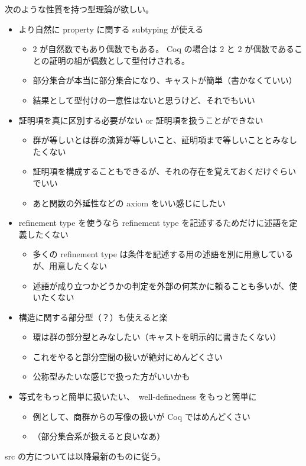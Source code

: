 次のような性質を持つ型理論が欲しい。

\begin{itemize}
  \item より自然に property に関する subtyping が使える
  \begin{itemize}
    \item \(2\) が自然数でもあり偶数でもある。
    Coq の場合は \(2\) と \(2\) が偶数であることの証明の組が偶数として型付けされる。
    \item 部分集合が本当に部分集合になり、キャストが簡単（書かなくていい）
    \item 結果として型付けの一意性はないと思うけど、それでもいい
  \end{itemize}

  \item 証明項を真に区別する必要がない or 証明項を扱うことができない
  \begin{itemize}
    \item 群が等しいとは群の演算が等しいこと、証明項まで等しいこととみなしたくない
    \item 証明項を構成することもできるが、それの存在を覚えておくだけぐらいでいい
    \item あと関数の外延性などの axiom をいい感じにしたい
  \end{itemize}

  \item refinement type を使うなら refinement type を記述するためだけに述語を定義したくない
  \begin{itemize}
    \item 多くの refinement type は条件を記述する用の述語を別に用意しているが、用意したくない
    \item 述語が成り立つかどうかの判定を外部の何某かに頼ることも多いが、使いたくない
  \end{itemize}

  \item 構造に関する部分型（？）も使えると楽
  \begin{itemize}
    \item 環は群の部分型とみなしたい（キャストを明示的に書きたくない）
    \item これをやると部分空間の扱いが絶対にめんどくさい
    \item 公称型みたいな感じで扱った方がいいかも
  \end{itemize}

  \item 等式をもっと簡単に扱いたい、　well-definedness をもっと簡単に
  \begin{itemize}
    \item 例として、商群からの写像の扱いが Coq ではめんどくさい
    \item （部分集合系が扱えると良いなあ）
  \end{itemize}

\end{itemize}

src の方については以降最新のものに従う。 \\